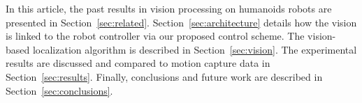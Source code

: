 In this article, the past results in vision processing on humanoids robots are presented in
Section~\ref{sec:related}. Section~\ref{sec:architecture} details how the vision is linked to the robot controller via our proposed control
scheme. The vision-based localization algorithm is described in Section~\ref{sec:vision}. The experimental results are discussed
and compared to motion capture data in Section~\ref{sec:results}. Finally, conclusions and future work are
described in Section~\ref{sec:conclusions}.


